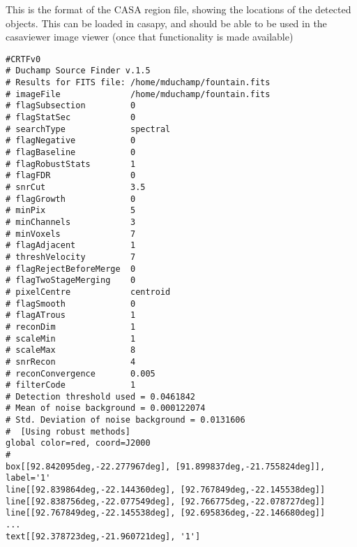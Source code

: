 %
%
%
%
\label{app-casa}

This is the format of the CASA region file, showing the locations
of the detected objects. This can be loaded in casapy, and should be
able to be used in the casaviewer image viewer (once that
functionality is made available)

\begin{verbatim}
#CRTFv0
# Duchamp Source Finder v.1.5
# Results for FITS file: /home/mduchamp/fountain.fits
# imageFile              /home/mduchamp/fountain.fits
# flagSubsection         0
# flagStatSec            0
# searchType             spectral
# flagNegative           0
# flagBaseline           0
# flagRobustStats        1
# flagFDR                0
# snrCut                 3.5
# flagGrowth             0
# minPix                 5
# minChannels            3
# minVoxels              7
# flagAdjacent           1
# threshVelocity         7
# flagRejectBeforeMerge  0
# flagTwoStageMerging    0
# pixelCentre            centroid
# flagSmooth             0
# flagATrous             1
# reconDim               1
# scaleMin               1
# scaleMax               8
# snrRecon               4
# reconConvergence       0.005
# filterCode             1
# Detection threshold used = 0.0461842
# Mean of noise background = 0.000122074
# Std. Deviation of noise background = 0.0131606
#  [Using robust methods]
global color=red, coord=J2000 
#
box[[92.842095deg,-22.277967deg], [91.899837deg,-21.755824deg]], label='1'
line[[92.839864deg,-22.144360deg], [92.767849deg,-22.145538deg]]
line[[92.838756deg,-22.077549deg], [92.766775deg,-22.078727deg]]
line[[92.767849deg,-22.145538deg], [92.695836deg,-22.146680deg]]
...
text[[92.378723deg,-21.960721deg], '1']

\end{verbatim}

